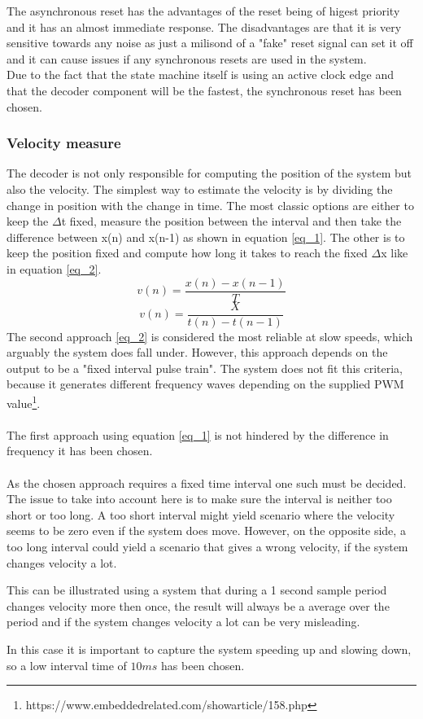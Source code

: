 \documentclass[../../../main]{subfiles}
\begin{document}
The asynchronous reset has the advantages of the reset being of higest priority and it has an almost immediate response.
The disadvantages are that it is very sensitive towards any noise as just a milisond of a "fake" reset signal can set it off and it can cause issues if any synchronous resets are used in the system. \\

Due to the fact that the state machine itself is using an active clock edge and that the decoder component will be the fastest, the synchronous reset has been chosen.
\subsubsection{Velocity measure}
The decoder is not only responsible for computing the position of the system but also the velocity. The simplest way to estimate the velocity is by dividing the change in position with the change in time. The most classic options are either to keep the $\Delta$t fixed, measure the position between the interval and then take the difference between x(n) and x(n-1) as shown in equation \ref{eq_1}. The other is to keep the position fixed and compute how long it takes to reach the fixed  $\Delta$x like in equation \ref{eq_2}.
\begin{equation}
v(n) = \frac{x(n)-x(n-1)}{T}
\label{eq_1}
\end{equation}
\begin{equation}
  v(n) = \frac{X}{t(n)-t(n-1)}
  \label{eq_2}
\end{equation}
The second approach \ref{eq_2} is considered the most reliable at slow speeds, which arguably the system does fall under. However, this approach depends on the output to be a "fixed interval pulse train". The system does not fit this criteria, because it generates different frequency waves depending on the supplied PWM value\footnote{https://www.embeddedrelated.com/showarticle/158.php}.\\
\\
The first approach using equation \ref{eq_1} is not hindered by the difference in frequency it has been chosen.  \\
\\
 As the chosen approach requires a fixed time interval one such must be decided. The issue to take into account here is to make sure the interval is neither too short or too long. A too short interval might yield scenario where the velocity seems to be zero even if the system does move. However, on the opposite side, a too long interval could yield a scenario that gives a wrong velocity, if the system changes velocity a lot.

This can be illustrated using a system that during a 1 second sample period changes velocity more then once, the result will always be a average over the period and if the system changes velocity a lot can be very misleading.

In this case it is important to capture the system speeding up and slowing down, so a low interval time of $10ms$ has been chosen.
\end{document}
